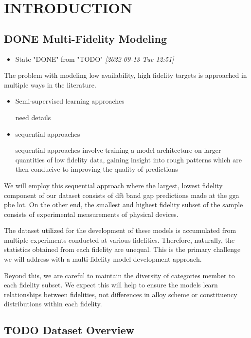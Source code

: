 \documentclass[aip, jmp, amsmath, amssymb]{revtex4-2}
\begin{document}
\section*{INTRODUCTION}
\label{sec:org7a5924d}
\subsection*{{\bfseries\sffamily DONE} Multi-Fidelity Modeling}
\label{sec:org03160c2}
\begin{itemize}
\item State "DONE"       from "TODO"       \textit{[2022-09-13 Tue 12:51]}
\end{itemize}
The problem with modeling low availability, high fidelity targets is
approached in multiple ways in the literature.

\begin{itemize}
\item Semi-supervised learning approaches

need details

\item sequential approaches

sequential approaches involve training a model architecture on
larger quantities of low fidelity data, gaining insight into rough
patterns which are then conducive to improving the quality of
predictions
\end{itemize}

We will employ this sequential approach where the largest, lowest
fidelity component of our dataset consists of \acrfull{dft} band gap predictions made at the \acrfull{gga} \acrfull{pbe} \gls{lot}. On
the other end, the smallest and highest fidelity subset of the sample
consists of experimental measurements of physical devices.

The dataset utilized for the development of these models is
accumulated from multiple experiments conducted at various
fidelities. Therefore, naturally, the statistics obtained from each
fidelity are unequal. This is the primary challenge we will address
with a multi-fidelity model development approach.

Beyond this, we are careful to maintain the diversity of categories
member to each fidelity subset. We expect this will help to ensure the
models learn relationships between fidelities, not differences in
alloy scheme or constituency distributions within each fidelity.

\subsection*{{\bfseries\sffamily TODO} Dataset Overview}
\label{sec:org1d0f90f}
\end{document}
